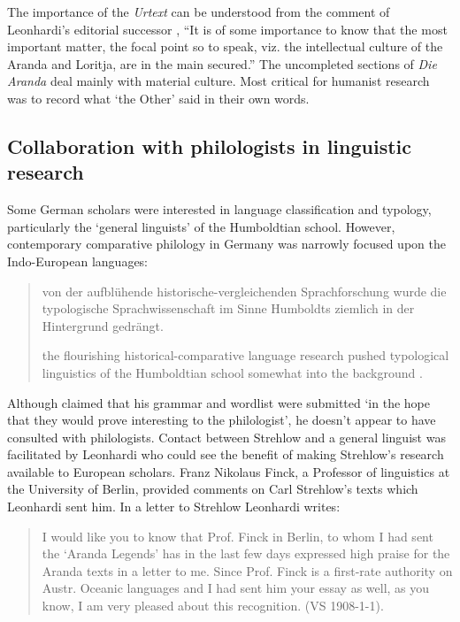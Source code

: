 \documentclass[output=paper]{langsci/langscibook}
\begin{document}
The importance of the \textit{Urtext} can be understood from the comment of Leonhardi’s editorial successor \citet[285]{hagen_preface_1991}, “It is of some importance to know that the most important matter, the focal point so to speak, viz. the intellectual culture of the Aranda and Loritja, are in the main secured.” The uncompleted sections of \textit{Die} \textit{Aranda} deal mainly with material culture. Most critical for humanist research was to record what ‘the Other’ said in their own words.

\subsection{Collaboration with philologists in linguistic research} 

Some German scholars were interested in language classification and typology, particularly the ‘general linguists’ of the Humboldtian school. However, contemporary comparative philology in Germany was narrowly focused upon the Indo-European languages:

\begin{quote}
    von der aufblühende historische-vergleichenden Sprachforschung wurde die typologische Sprachwissenschaft im Sinne Humboldts ziemlich in der Hintergrund gedrängt. 
    
    the flourishing historical-comparative language research pushed typological linguistics of the Humboldtian school somewhat into the background \citep[216]{deeters_vergleichende_1937}.  
\end{quote}

Although \citet[1]{kempe_grammar_1891} claimed that his grammar and wordlist were submitted ‘in the hope that they would prove interesting to the philologist’, he doesn’t appear to have consulted with philologists. Contact between Strehlow and a general linguist was facilitated by Leonhardi who could see the benefit of making Strehlow’s research available to European scholars. Franz Nikolaus Finck, a Professor of linguistics at the University of Berlin, provided comments on Carl Strehlow’s texts which Leonhardi sent him. In a letter to Strehlow Leonhardi writes: 

\begin{quote}
    I would like you to know that Prof. Finck in Berlin, to whom I had sent the ‘Aranda Legends’ has in the last few days expressed high praise for the Aranda texts in a letter to me. Since Prof. Finck is a first-rate authority on Austr. Oceanic languages and I had sent him your essay as well, as you know, I am very pleased about this recognition.  (VS 1908-1-1).
\end{quote}
\end{document}
